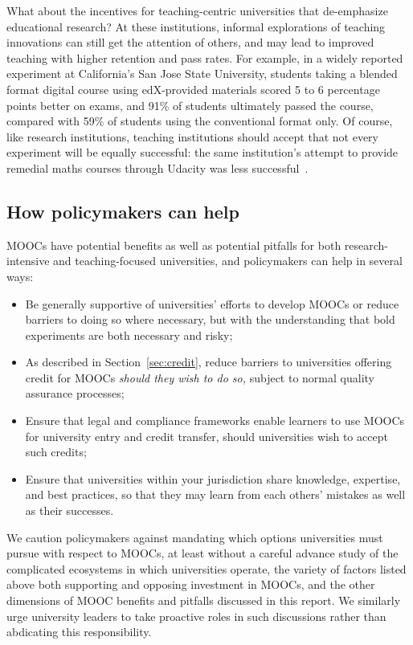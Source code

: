 What about the incentives for teaching-centric universities that
de-emphasize educational research?
At these institutions, informal explorations of teaching innovations
can still get the attention of others, and may lead to improved
teaching with higher retention and pass rates.  For example, in a widely
reported experiment at California's San Jose State University, students
taking a blended format digital course using edX-provided materials
scored 5 to 6 percentage points better on exams, and 91\% of students
ultimately passed the course, compared with 59\% of students using the
conventional format only.  Of course, like research institutions,
teaching institutions should accept that not every experiment will be
equally successful: the same institution's attempt to provide remedial
maths courses through Udacity was less successful~\cite{cheal-sjsu-moocs}.

 
\subsection{How policymakers can help} 

MOOCs have potential benefits as
well as potential pitfalls for both research-intensive and
teaching-focused universities, and policymakers can help in several
ways:



\begin{itemize}

\item Be generally supportive of universities' efforts to develop MOOCs or reduce barriers to doing
  so where necessary, but with the understanding that bold experiments are both necessary and risky;

\item As described in Section~\ref{sec:credit}, reduce barriers to universities offering credit for
  MOOCs \emph{should they wish to do so,} subject to normal quality assurance processes;

\item Ensure that legal and compliance frameworks enable learners to use MOOCs for university entry
  and credit transfer, should universities wish to accept such credits;

\item Ensure that universities within your jurisdiction share knowledge, expertise, and best
  practices, so that they may learn from each others' mistakes as well as their successes.

\end{itemize}

We caution policymakers against mandating which options universities
must pursue with respect to MOOCs, at least without a careful advance
study of the complicated ecosystems in which universities operate,
the variety of factors listed above both supporting and opposing investment in
MOOCs, and the other dimensions of MOOC benefits and pitfalls discussed in this
report.  We similarly urge university leaders to take proactive roles in
such discussions rather than abdicating this responsibility.

